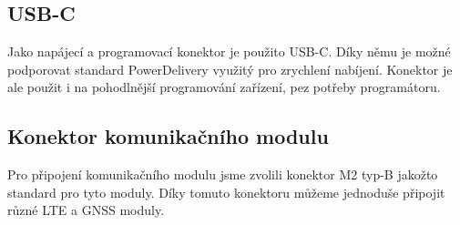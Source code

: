 \subsection{USB-C}
Jako napájecí a programovací konektor je použito USB-C.
Díky němu je možné podporovat standard PowerDelivery využitý pro zrychlení nabíjení.
Konektor je ale použit i na pohodlnější programování zařízení, pez potřeby programátoru.

\subsection{Konektor komunikačního modulu}
Pro připojení komunikačního modulu jsme zvolili konektor M2 typ-B jakožto standard pro tyto moduly.
Díky tomuto konektoru můžeme jednoduše připojit různé LTE a GNSS moduly.








